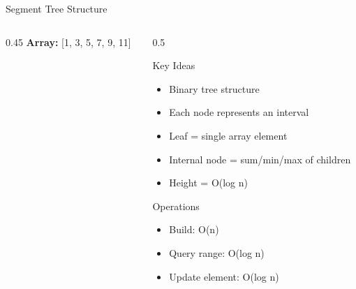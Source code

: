 \documentclass[aspectratio=169,xcolor=dvipsnames]{beamer}
\begin{document}
\begin{frame}{Segment Tree Structure}
  \begin{columns}
    \begin{column}{0.45\textwidth}
      \textbf{Array:} [1, 3, 5, 7, 9, 11]

      \vspace{0.3cm}

    \end{column}
    \begin{column}{0.5\textwidth}
      \begin{block}{Key Ideas}
        \begin{itemize}
          \item Binary tree structure
          \item Each node represents an interval
          \item Leaf = single array element
          \item Internal node = sum/min/max of children
          \item Height = O(log n)
        \end{itemize}
      \end{block}

      \begin{block}{Operations}
        \begin{itemize}
          \item Build: O(n)
          \item Query range: O(log n)
          \item Update element: O(log n)
        \end{itemize}
      \end{block}
    \end{column}
  \end{columns}
\end{frame}
\end{document}
